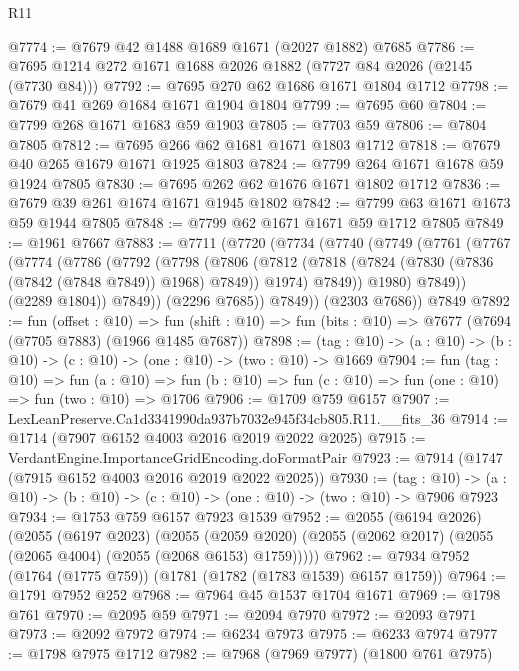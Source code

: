 \begin{lexlean}{R11}
\begin{coremodule}
@7774 := @7679 @42 @1488 @1689 @1671 (@2027 @1882) @7685
@7786 := @7695 @1214 @272 @1671 @1688 @2026 @1882 (@7727 @84 @2026 (@2145 (@7730 @84)))
@7792 := @7695 @270 @62 @1686 @1671 @1804 @1712
@7798 := @7679 @41 @269 @1684 @1671 @1904 @1804
@7799 := @7695 @60
@7804 := @7799 @268 @1671 @1683 @59 @1903
@7805 := @7703 @59
@7806 := @7804 @7805
@7812 := @7695 @266 @62 @1681 @1671 @1803 @1712
@7818 := @7679 @40 @265 @1679 @1671 @1925 @1803
@7824 := @7799 @264 @1671 @1678 @59 @1924 @7805
@7830 := @7695 @262 @62 @1676 @1671 @1802 @1712
@7836 := @7679 @39 @261 @1674 @1671 @1945 @1802
@7842 := @7799 @63 @1671 @1673 @59 @1944 @7805
@7848 := @7799 @62 @1671 @1671 @59 @1712 @7805
@7849 := @1961 @7667
@7883 := @7711
    (@7720
      (@7734
        (@7740
          (@7749
            (@7761
              (@7767
                (@7774
                  (@7786
                    (@7792
                      (@7798
                        (@7806
                          (@7812
                            (@7818 (@7824 (@7830 (@7836 (@7842 (@7848 @7849)) @1968) @7849)) @1974)
                            @7849))
                        @1980)
                      @7849))
                  (@2289 @1804))
                @7849))
            (@2296 @7685))
          @7849))
      (@2303 @7686))
    @7849
@7892 := fun (offset : @10) =>
  fun (shift : @10) => fun (bits : @10) => @7677 (@7694 (@7705 @7883) (@1966 @1485 @7687))
@7898 := (tag : @10) -> (a : @10) -> (b : @10) -> (c : @10) -> (one : @10) -> (two : @10) -> @1669
@7904 := fun (tag : @10) =>
  fun (a : @10) => fun (b : @10) => fun (c : @10) => fun (one : @10) => fun (two : @10) => @1706
@7906 := @1709 @759 @6157
@7907 := LexLeanPreserve.Ca1d3341990da937b7032e945f34cb805.R11.__fits_36
@7914 := @1714 (@7907 @6152 @4003 @2016 @2019 @2022 @2025)
@7915 := VerdantEngine.ImportanceGridEncoding.doFormatPair
@7923 := @7914 (@1747 (@7915 @6152 @4003 @2016 @2019 @2022 @2025))
@7930 := (tag : @10) ->
  (a : @10) -> (b : @10) -> (c : @10) -> (one : @10) -> (two : @10) -> @7906 @7923
@7934 := @1753 @759 @6157 @7923 @1539
@7952 := @2055
    (@6194 @2026)
    (@2055
      (@6197 @2023)
      (@2055 (@2059 @2020) (@2055 (@2062 @2017) (@2055 (@2065 @4004) (@2055 (@2068 @6153) @1759)))))
@7962 := @7934 @7952 (@1764 (@1775 @759)) (@1781 (@1782 (@1783 @1539) @6157 @1759))
@7964 := @1791 @7952 @252
@7968 := @7964 @45 @1537 @1704 @1671
@7969 := @1798 @761
@7970 := @2095 @59
@7971 := @2094 @7970
@7972 := @2093 @7971
@7973 := @2092 @7972
@7974 := @6234 @7973
@7975 := @6233 @7974
@7977 := @1798 @7975 @1712
@7982 := @7968 (@7969 @7977) (@1800 @761 @7975)

\end{coremodule}
\end{lexlean}
